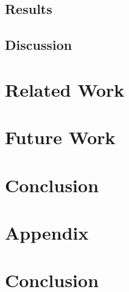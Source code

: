 \documentclass[a4paper,11pt]{article}
\begin{document}
\subsection{Results}


\subsection{Discussion}



\section{Related Work}


\section{Future Work}


\section{Conclusion}


\section{Appendix}














\section{Conclusion}

\end{document}
